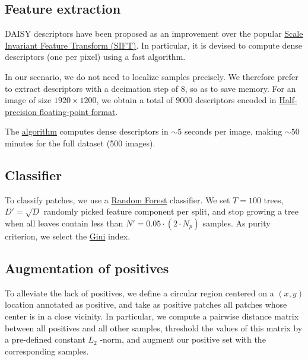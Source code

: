 \documentclass[11pt]{article}
\begin{document}
\subsection{Feature extraction}
\label{sec:org4a6c296}

DAISY descriptors have been proposed as an improvement over the popular \href{https://en.wikipedia.org/wiki/Scale-invariant\_feature\_transform}{Scale Invariant Feature Transform (SIFT)}.
In particular, it is devised to compute dense descriptors (one per pixel) using a fast algorithm.

In our scenario, we do not need to localize samples precisely.
We therefore prefer to extract descriptors with a decimation step of \(8\), so as to save memory.
For an image of size \(1920 \times 1200\), we obtain a total of \(9000\) descriptors encoded in \href{https://en.wikipedia.org/wiki/Half-precision\_floating-point\_format}{Half-precision floating-point format}.

The \href{https://github.com/scikit-image/scikit-image/blob/main/skimage/feature/\_daisy.py\#L9-L222}{algorithm} computes dense descriptors in \(\sim 5\) seconds per image, making \(\sim 50\) minutes for the full dataset (500 images).

\subsection{Classifier}
\label{sec:orga9d1854}

To classify patches, we use a \href{https://en.wikipedia.org/wiki/Random\_forest}{Random Forest} classifier.
We set \(T=100\) trees, \(D'=\sqrt{D}\) randomly picked feature component per split, and stop growing a tree
when all leaves contain less than \(N'=0.05 \cdot (2 \cdot N_p)\) samples.
As purity criterion, we select the \href{https://en.wikipedia.org/wiki/Gini\_coefficient}{Gini} index.

\subsection{Augmentation of positives}
\label{sec:org767b1ac}

To alleviate the lack of positives, we define a circular region centered on a \((x,y)\) location
annotated as positive, and
take as positive patches all patches whose center is in a close vicinity.
In particular, we compute a pairwise distance matrix between all positives and all other samples,
threshold the values of this matrix by a pre-defined constant \(L_2\) -norm,
and augment our positive set with the corresponding samples.
\end{document}
